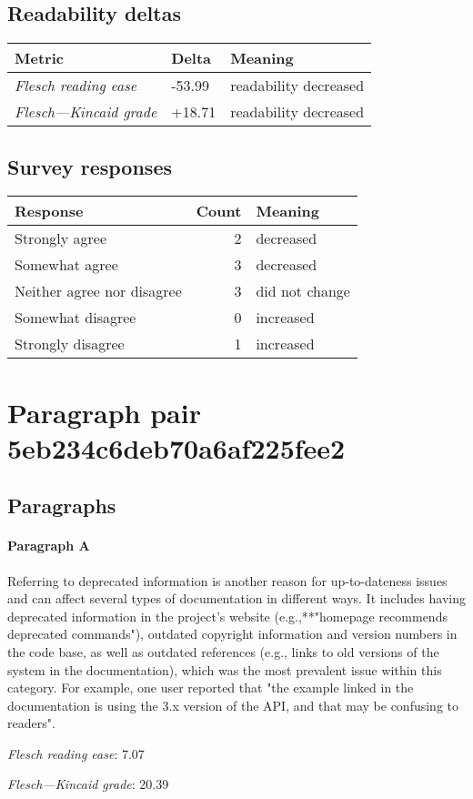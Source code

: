 \subsection{Readability deltas}

\begin{tabular}{lll}
\toprule
               \textbf{Metric} & \textbf{Delta} &       \textbf{Meaning} \\
\midrule
    \emph{Flesch reading ease} &         -53.99 &  readability decreased \\
 \emph{Flesch---Kincaid grade} &         +18.71 &  readability decreased \\
\bottomrule
\end{tabular}

\subsection{Survey responses}
\begin{tabular}{lrl}
\toprule
          \textbf{Response} &  \textbf{Count} & \textbf{Meaning} \\
\midrule
             Strongly agree &               2 &        decreased \\
             Somewhat agree &               3 &        decreased \\
 Neither agree nor disagree &               3 &   did not change \\
          Somewhat disagree &               0 &        increased \\
          Strongly disagree &               1 &        increased \\
\bottomrule
\end{tabular}

\section{Paragraph pair 5eb234c6deb70a6af225fee2}
\subsection{Paragraphs}
\paragraph{Paragraph A}
Referring to deprecated information is another reason for up-to-dateness issues and can affect several types of documentation in different ways. It includes having deprecated information in the project's website (e.g.,**"homepage recommends deprecated commands"), outdated copyright information and version numbers in the code base, as well as outdated references (e.g., links to old versions of the system in the documentation), which was the most prevalent issue within this category. For example, one user reported that "the example linked in the documentation is using the 3.x version of the API, and that may be confusing to readers".\par\medskip
\emph{Flesch reading ease}: 7.07\par
\emph{Flesch---Kincaid grade}: 20.39

